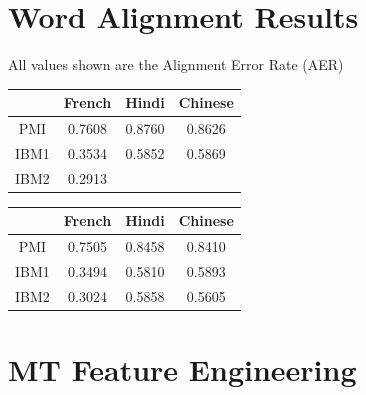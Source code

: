 \documentclass{article}
\begin{document}
\section*{Word Alignment Results}
All values shown are the Alignment Error Rate (AER)
\begin{center}
 \label{tab:title} 
\def\arraystretch{1.5}
\begin{tabular} {c|c|c|c}
 &French&Hindi&Chinese \\
\hline
PMI&0.7608&0.8760&0.8626 \\
IBM1&0.3534&0.5852&0.5869 \\
IBM2&0.2913&& \\
\end{tabular}


 \label{tab:title} 
\begin{tabular} {c|c|c|c}
 &French&Hindi&Chinese \\
\hline
PMI&0.7505&0.8458&0.8410 \\
IBM1&0.3494&0.5810&0.5893 \\
IBM2&0.3024&0.5858&0.5605 \\
\end{tabular}
\end{center}
\section*{MT Feature Engineering}
\end{document}
